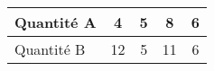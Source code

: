 
\begin{tabular}{|l|c|c|c|c|}
\hline
Quantité A & 4 & 5 & 8 & 6  \\ \hline
Quantité B & 12 & 5 & 11 & 6 \\ \hline
\end{tabular}

